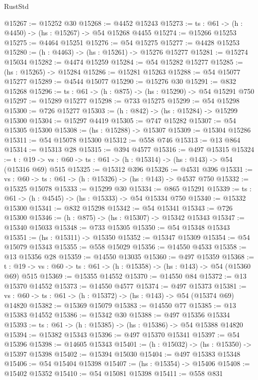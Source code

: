\begin{lexlean}{RustStd}
\begin{coremodule}
@15267 := @15252 @30
@15268 := @4452 @15243
@15273 := {ts : @61} -> (h : @4450) -> (hs : @15267) -> @54 @15268 @4455
@15274 := @15266 @15253
@15275 := @4464 @15251
@15276 := @54 @15275
@15277 := @4428 @15253
@15280 := (h : @4463) -> (hs : @15261) -> @15276 @15277
@15281 := @15274 @15034
@15282 := @4474 @15259
@15284 := @54 @15282 @15277
@15285 := (hs : @15265) -> @15284
@15286 := @15281 @15263
@15288 := @54 @15077 @15277
@15289 := @4544 @15077
@15290 := @15276 @30
@15291 := @832 @15268
@15296 := {ts : @61} -> (h : @875) -> (hs : @15290) -> @54 @15291 @750
@15297 := @15289 @15277
@15298 := @733 @15275
@15299 := @54 @15298
@15300 := @726 @15277
@15303 := (h : @842) -> (hs : @15284) -> @15299 @15300
@15304 := @15297 @4419
@15305 := @747 @15282
@15307 := @54 @15305 @15300
@15308 := (hs : @15288) -> @15307
@15309 := @15304 @15286
@15311 := @54 @15078 @15300
@15312 := @558 @746
@15313 := @13 @864
@15314 := @15313 @28
@15315 := @394 @4577
@15316 := @497 @15315
@15324 := {t : @19} ->
  {vs : @60} -> {ts : @61} -> (h : @15314) -> (hs : @143) -> @54 (@15316 @69) @515
@15325 := @15312 @396
@15326 := @4531 @396
@15331 := {vs : @60} -> {ts : @61} -> (h : @15326) -> (hs : @143) -> @4537 @750
@15332 := @15325 @15078
@15333 := @15299 @30
@15334 := @865 @15291
@15339 := {ts : @61} -> (h : @4545) -> (hs : @15333) -> @54 @15334 @750
@15340 := @15332 @15300
@15341 := @832 @15298
@15342 := @54 @15341
@15343 := @726 @15300
@15346 := (h : @875) -> (hs : @15307) -> @15342 @15343
@15347 := @15340 @15033
@15348 := @733 @15305
@15350 := @54 @15348 @15343
@15351 := (hs : @15311) -> @15350
@15352 := @15347 @15309
@15354 := @54 @15079 @15343
@15355 := @558 @15029
@15356 := @14550 @4533
@15358 := @13 @15356 @28
@15359 := @14550 @13035
@15360 := @497 @15359
@15368 := {t : @19} ->
  {vs : @60} -> {ts : @61} -> (h : @15358) -> (hs : @143) -> @54 (@15360 @69) @515
@15369 := @15355 @14552
@15370 := @14550 @84
@15372 := @13 @15370 @14552
@15373 := @14550 @4577
@15374 := @497 @15373
@15381 := {vs : @60} -> {ts : @61} -> (h : @15372) -> (hs : @143) -> @54 (@15374 @69) @14820
@15382 := @15369 @15079
@15383 := @14550 @77
@15385 := @13 @15383 @14552
@15386 := @15342 @30
@15388 := @497 @15356 @15334
@15393 := {ts : @61} -> (h : @15385) -> (hs : @15386) -> @54 @15388 @14820
@15394 := @15382 @15343
@15396 := @497 @15370 @15341
@15397 := @54 @15396
@15398 := @14605 @15343
@15401 := (h : @15032) -> (hs : @15350) -> @15397 @15398
@15402 := @15394 @15030
@15404 := @497 @15383 @15348
@15406 := @54 @15404 @15398
@15407 := (hs : @15354) -> @15406
@15408 := @15402 @15352
@15410 := @54 @15081 @15398
@15411 := @558 @831

\end{coremodule}
\end{lexlean}

